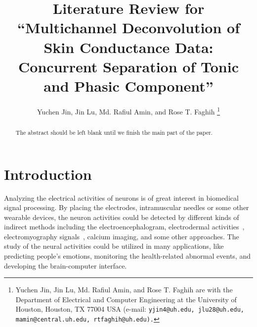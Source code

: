 \documentclass[10pt,conference]{ieeeconf}
\begin{document}
\title{Literature Review for ``Multichannel Deconvolution of Skin Conductance Data: Concurrent Separation of Tonic and Phasic Component''}


\author{Yuchen Jin, Jin Lu, Md. Rafiul Amin, and Rose T. Faghih \thanks{Yuchen Jin, Jin Lu, Md. Rafiul Amin, and Rose T. Faghih are with the Department of Electrical and Computer Engineering at the University of Houston, Houston, TX 77004 USA (e-mail: \tt\small  yjin4@uh.edu, jlu28@uh.edu, mamin@central.uh.edu, rtfaghih@uh.edu).} 
}

\maketitle

\begin{abstract}

The abstract should be left blank until we finish the main part of the paper.

\end{abstract}

\section{Introduction} \label{introduction}

Analyzing the electrical activities of neurons is of great interest in biomedical signal processing. By placing the electrodes, intramuscular needles or some other wearable devices, the neuron activities could be detected by different kinds of indirect methods including the electroencephalogram, electrodermal activities~\cite{savazzi2019estimation,jain2016compressed,amin2019robust}, electromyography signals~\cite{biagetti2016homomorphic}, calcium imaging, and some other approaches. The study of the neural activities could be utilized in many applications, like predicting people's emotions, monitoring the health-related abnormal events, and developing the brain-computer interface.
\end{document}
